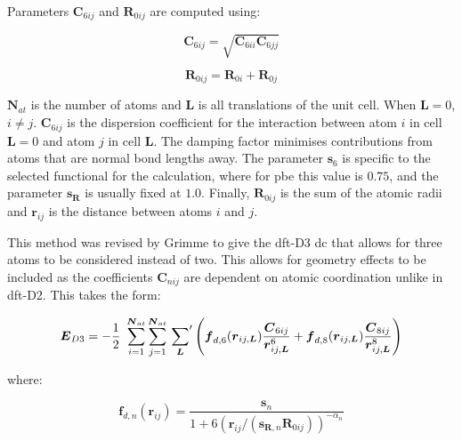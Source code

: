 Parameters \( \boldsymbol{C}_{6ij} \) and \( \boldsymbol{R}_{0ij} \) are computed using:

\begin{equation}
\boldsymbol{C}_{6ij} = \sqrt{\boldsymbol{C}_{6ii} \boldsymbol{C}_{6jj}} 
\end{equation}

\begin{equation}
\boldsymbol{R}_{0ij} = \boldsymbol{R}_{0i} + \boldsymbol{R}_{0j} 
\end{equation}

\(\boldsymbol{N}_{at}\) is the number of atoms and \(\boldsymbol{L}\) is all translations of the unit cell. When \(\boldsymbol{L} = 0\), \(i \neq j\). \(\boldsymbol{C}_{6ij}\) is the dispersion coefficient for the interaction between atom \(i\) in cell \(\boldsymbol{L} = 0\) and atom \(j\) in cell \(\boldsymbol{L}\). The damping factor minimises contributions from atoms that are normal bond lengths away. The parameter \(\boldsymbol{s}_6\) is specific to the selected functional for the calculation, where for \acrshort{pbe} this value is \(0.75\), and  the parameter \(\boldsymbol{s}_{\boldsymbol{R}}\) is usually fixed at \(1.0\). Finally, \(\boldsymbol{R}_{0ij}\) is the sum of the atomic radii and \(\boldsymbol{r}_{ij}\) is the distance between atoms \(i\) and \(j\).

This method was revised by Grimme to give the \acrshort{dft}\nobreakdash-D3 \cite{Grimme2010} \acrshort{dc} that allows for three atoms to be considered instead of two. This allows for geometry effects to be included as the coefficients \(\boldsymbol{C}_{nij}\) are dependent on atomic coordination unlike in \acrshort{dft}\nobreakdash-D2. This takes the form:

\begin{equation}
\boldsymbol{E}_{D3} = -\frac{1}{2}\ \sum_{i=1}^{\boldsymbol{N}_{at}} \sum_{j=1}^{\boldsymbol{N}_{at}} \sideset{}{'}\sum_{\boldsymbol{L}} \left(\boldsymbol{f}_{d,6} (\boldsymbol{r}_{ij, \boldsymbol{L}}) \frac{\boldsymbol{C}_{6ij}} {\boldsymbol{r}_{ij,\boldsymbol{L}}^6} + \boldsymbol{f}_{d,8} (\boldsymbol{r}_{ij, \boldsymbol{L}}) \frac{\boldsymbol{C}_{8ij}} {\boldsymbol{r}_{ij,\boldsymbol{L}}^8}\right)
\end{equation}

where:

\begin{equation}
\boldsymbol{f}_{d,n}(\boldsymbol{r}_{ij}) = \frac{\boldsymbol{s}_n}{1 + 6 (\boldsymbol{r}_{ij} / (\boldsymbol{s}_{\boldsymbol{R},n} \boldsymbol{R}_{0ij}))^{-{\alpha}_{n}}} 
\end{equation}

